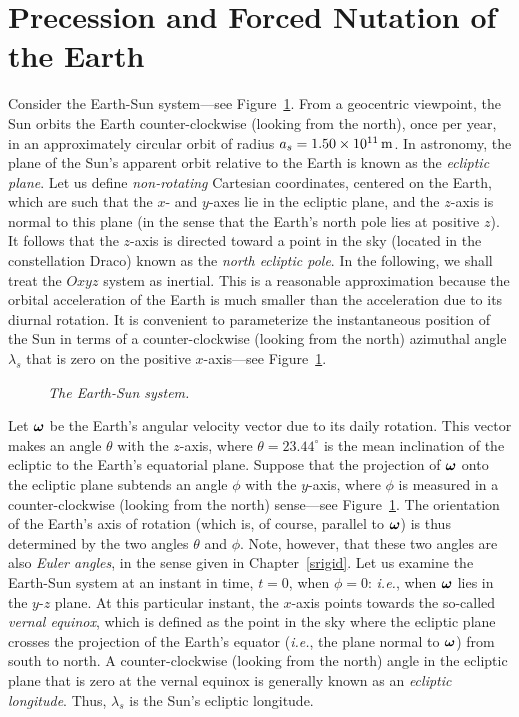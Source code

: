 \section{Precession and Forced Nutation of the Earth}\label{sprec}
Consider the Earth-Sun system---see Figure~\ref{fesun}. From a geocentric viewpoint, the Sun orbits the Earth  counter-clockwise  (looking from the north), once per year, in an approximately circular orbit
of radius $a_s= 1.50\times 10^{11}\,{\rm m}$. In astronomy, the plane of the Sun's
apparent orbit relative to the Earth is known as the {\em ecliptic plane}. 
Let us define {\em non-rotating}\/ Cartesian coordinates, centered on the Earth, which are such that the $x$- and $y$-axes lie in the
ecliptic plane, and the $z$-axis is normal to this plane (in the
sense that the Earth's north pole lies at positive $z$). It follows that
the $z$-axis is directed toward a  point in the sky (located in the constellation Draco) known as the {\em north
ecliptic pole}. In the following, we shall treat the $Oxyz$ system as inertial. This is a reasonable
approximation because the orbital acceleration of the Earth is much smaller than the acceleration due to its diurnal rotation.
It is convenient to parameterize the instantaneous position
of the Sun in terms of a counter-clockwise (looking from the north) azimuthal angle $\lambda_s$ that is zero on the positive $x$-axis---see Figure~\ref{fesun}.

\begin{figure}
\epsfysize=2.25in
\centerline{}
\caption{\em The Earth-Sun system.}\label{fesun}
\end{figure}

Let $\mbox{\boldmath$\omega$}$ be the Earth's angular velocity vector due to its
daily rotation. This vector makes an angle $\theta$ with the $z$-axis,
where $\theta = 23.44^\circ$ is the mean inclination of the ecliptic to the
Earth's equatorial plane. Suppose that the projection of $\mbox{\boldmath$\omega$}$
onto the ecliptic plane subtends an angle $\phi$ with the $y$-axis,
where $\phi$ is measured in a counter-clockwise (looking from the north) sense---see Figure~\ref{fesun}.
The orientation of the Earth's axis of rotation (which is, of course, parallel
to $\mbox{\boldmath$\omega$}$) is thus determined by the two angles $\theta$ and $\phi$.
Note, however, that these two angles are also {\em Euler angles}, in
the sense given in Chapter~\ref{srigid}. Let us examine the Earth-Sun
system at an instant in time, $t=0$,  when $\phi=0$: {\em i.e.}, when
$\mbox{\boldmath$\omega$}$ lies in the $y$-$z$ plane. At this particular instant, the $x$-axis points towards the so-called {\em vernal equinox},
which is defined as the point in the sky where  the ecliptic plane crosses the projection of the Earth's
equator ({\em i.e.}, the plane normal to $\mbox{\boldmath$\omega$}$) from south to north. A counter-clockwise (looking from the north) angle in the
ecliptic plane that is zero at the vernal equinox is generally known as an {\em ecliptic longitude}. Thus, $\lambda_s$ is the
Sun's ecliptic longitude. 

